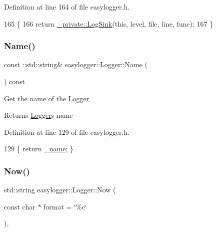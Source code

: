 Definition at line 164 of file easylogger.\+h.


\begin{DoxyCode}
165                                                                    \{
166             \textcolor{keywordflow}{return} \mbox{\hyperlink{classeasylogger_1_1_logger_a27353f6b5bf33ecd1b185b743973fb72}{\_private::LogSink}}(\textcolor{keyword}{this}, level, file, line, func);
167         \}
\end{DoxyCode}
\mbox{\label{classeasylogger_1_1_logger_af4c45483c08f4a44ffaff4e86b7012b0}} 
\subsubsection{\texorpdfstring{Name()}{Name()}}
{\footnotesize\ttfamily const \+::std\+::string\& easylogger\+::\+Logger\+::\+Name (\begin{DoxyParamCaption}{ }\end{DoxyParamCaption}) const\hspace{0.3cm}{\ttfamily [inline]}}

Get the name of the \mbox{\hyperlink{classeasylogger_1_1_logger}{Logger}}

\begin{DoxyReturn}{Returns}
\mbox{\hyperlink{classeasylogger_1_1_logger}{Logger}}\textquotesingle{}s name 
\end{DoxyReturn}


Definition at line 129 of file easylogger.\+h.


\begin{DoxyCode}
129 \{ \textcolor{keywordflow}{return} \mbox{\hyperlink{classeasylogger_1_1_logger_a3055e76f000f45c8db2b5390776bc131}{\_name}}; \}
\end{DoxyCode}
\mbox{\label{classeasylogger_1_1_logger_abee0060678a306c347edf917c311dfce}} 
\subsubsection{\texorpdfstring{Now()}{Now()}}
{\footnotesize\ttfamily std\+::string easylogger\+::\+Logger\+::\+Now (\begin{DoxyParamCaption}\item[{const char $\ast$}]{format = {\ttfamily \char`\"{}\%c\char`\"{}} }\end{DoxyParamCaption})\hspace{0.3cm}{\ttfamily [inline]}, {\ttfamily [private]}}



